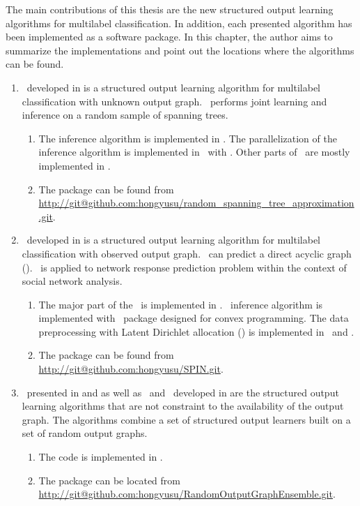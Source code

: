{The main contributions of this thesis are the new structured output learning algorithms for multilabel classification.
In addition, each presented algorithm has been implemented as a software package.
In this chapter, the author aims to summarize the implementations and point out the locations where the algorithms can be found.

\begin{enumerate}
	\item \rta\ developed in  is a structured output learning algorithm for multilabel classification with unknown output graph. \rta\ performs joint learning and inference on a random sample of spanning trees.
	\begin{enumerate}
		\item The inference algorithm is implemented in \cpp. The parallelization of the inference algorithm is implemented in \cpp\ with \openmp. Other parts of \rta\ are mostly implemented in \matlab.
		\item The package can be found from \url{http://git@github.com:hongyusu/random_spanning_tree_approximation.git}.
	\end{enumerate}
	
	\item \spin\ developed in  is a structured output learning algorithm for multilabel classification with observed output graph. \spin\ can predict a direct acyclic graph (\daggraph). \spin\ is applied to network response prediction problem within the context of social network analysis.
	\begin{enumerate}
		\item The major part of the \spin\ is implemented in \matlab. \sdp\ inference algorithm is implemented with \cvx\ package designed for convex programming. The data preprocessing with Latent Dirichlet allocation (\lda) \citep{Blei03latent} is implemented in \python\ and \matlab.
		\item The package can be found from \url{http://git@github.com:hongyusu/SPIN.git}.
	\end{enumerate}
	
	\item \mve\ presented in  and  as well as \amm\ and \mam\ developed in  are the structured output learning algorithms that are not constraint to the availability of the output graph. The algorithms combine a set of structured output learners built on a set of random output graphs.
	\begin{enumerate}
		\item The code is implemented in \matlab.
		\item The package can be located from \url{http://git@github.com:hongyusu/RandomOutputGraphEnsemble.git}.
	\end{enumerate}
	

\end{enumerate}}
